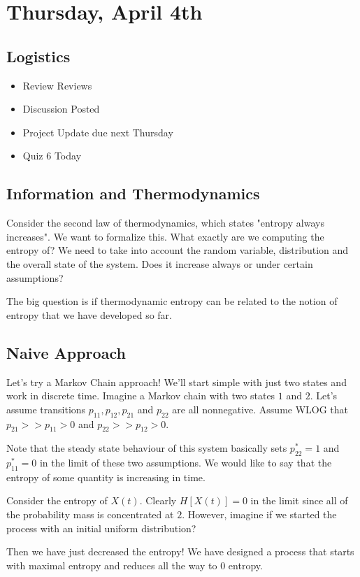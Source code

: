 \section{Thursday, April 4th}
\subsection{Logistics}
\begin{itemize}
    \item Review Reviews
    \item Discussion Posted
    \item Project Update due next Thursday
    \item Quiz 6 Today
\end{itemize}

\subsection{Information and Thermodynamics}
Consider the second law of thermodynamics, which states "entropy always increases". We want to formalize this. What exactly are we computing the entropy of? We need to take into account the random variable, distribution and the overall state of the system. Does it increase always or under certain assumptions?

The big question is if thermodynamic entropy can be related to the notion of entropy that we have developed so far. 

\subsection{Naive Approach}
Let's try a Markov Chain approach! We'll start simple with just two states and work in discrete time. Imagine a Markov chain with two states $\boxed1$ and $\boxed2$. Let's assume transitions $p_{11}, p_{12}, p_{21}$ and $p_{22}$ are all nonnegative. Assume WLOG that $p_{21}>>p_{11}>0$ and $p_{22} >> p_{12}>0$. 

Note that the steady state behaviour of this system basically sets $p^*_{22}=1$ and $p^*_{11} = 0$ in the limit of these two assumptions. We would like to say that the entropy of some quantity is increasing in time. 

Consider the entropy of $X(t)$. Clearly $H[X(t)] = 0$ in the limit since all of the probability mass is concentrated at $\boxed2$. However, imagine if we started the process with an initial uniform distribution? 

Then we have just decreased the entropy! We have designed a process that starts with maximal entropy and reduces all the way to $0$ entropy. 

